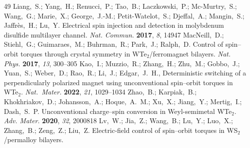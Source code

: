 \documentclass[journal=jacsat,manuscript=article]{achemso}
\begin{document}
\begin{mcitethebibliography}{49}
\mciteSetBstMidEndSepPunct{\mcitedefaultmidpunct}
{\mcitedefaultendpunct}{\mcitedefaultseppunct}\relax
\EndOfBibitem
{}
Liang,~S.; Yang,~H.; Renucci,~P.; Tao,~B.; Laczkowski,~P.; Mc-Murtry,~S.;
  Wang,~G.; Marie,~X.; George,~J.-M.; Petit-Watelot,~S.; Djeffal,~A.;
  Mangin,~S.; Jaffrès,~H.; Lu,~Y. Electrical spin injection and detection in
  molybdenum disulfide multilayer channel. \emph{Nat. Commun.} \textbf{2017},
  \emph{8}, 14947\relax
\mciteBstWouldAddEndPuncttrue
\mciteSetBstMidEndSepPunct{\mcitedefaultmidpunct}
{\mcitedefaultendpunct}{\mcitedefaultseppunct}\relax
\EndOfBibitem
{}
MacNeill,~D.; Stiehl,~G.; Guimaraes,~M.; Buhrman,~R.; Park,~J.; Ralph,~D.
  Control of spin--orbit torques through crystal symmetry in
  WTe$_2$/ferromagnet bilayers. \emph{Nat. Phys.} \textbf{2017}, \emph{13},
  300--305\relax
\mciteBstWouldAddEndPuncttrue
\mciteSetBstMidEndSepPunct{\mcitedefaultmidpunct}
{\mcitedefaultendpunct}{\mcitedefaultseppunct}\relax
\EndOfBibitem
{}
Kao,~I.; Muzzio,~R.; Zhang,~H.; Zhu,~M.; Gobbo,~J.; Yuan,~S.; Weber,~D.;
  Rao,~R.; Li,~J.; Edgar,~J.~H.,   Deterministic switching of a
  perpendicularly polarized magnet using unconventional spin--orbit torques in
  WTe$_2$. \emph{Nat.~Mater.} \textbf{2022}, \emph{21}, 1029--1034\relax
\mciteBstWouldAddEndPuncttrue
\mciteSetBstMidEndSepPunct{\mcitedefaultmidpunct}
{\mcitedefaultendpunct}{\mcitedefaultseppunct}\relax
\EndOfBibitem
{}
Zhao,~B.; Karpiak,~B.; Khokhriakov,~D.; Johansson,~A.; Hoque,~A.~M.; Xu,~X.;
  Jiang,~Y.; Mertig,~I.; Dash,~S.~P. Unconventional charge--spin conversion in
  Weyl-semimetal WTe$_2$. \emph{Adv. Mater.} \textbf{2020}, \emph{32},
  2000818\relax
\mciteBstWouldAddEndPuncttrue
\mciteSetBstMidEndSepPunct{\mcitedefaultmidpunct}
{\mcitedefaultendpunct}{\mcitedefaultseppunct}\relax
\EndOfBibitem
{}
Lv,~W.; Jia,~Z.; Wang,~B.; Lu,~Y.; Luo,~X.; Zhang,~B.; Zeng,~Z.; Liu,~Z.
  Electric-field control of spin--orbit torques in WS$_2$/permalloy bilayers.

\end{mcitethebibliography}
\end{document}
